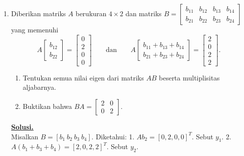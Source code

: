 \documentclass[12pt,twoside]{article}
\newenvironment{solution}
{
	\par\noindent\textbf{\underline{Solusi.}}\\
}
{
	\par
}
\begin{document}
\begin{enumerate}
\begin{solution}
          \textbf{(b) Keberadaan $z$ dengan $|p(z)| > 1$}
          Diketahui $|abc| > 1$. Ini mengimplikasikan setidaknya salah satu dari $|a|, |b|, |c| > 1$.
          Gunakan Identitas Parseval untuk polinomial pada lingkaran satuan:
          \[ \frac{1}{2\pi} \int_0^{2\pi} |p(e^{i\theta})|^2 d\theta = |a|^2 + |b|^2 + |c|^2 \]
          Andaikan $|p(z)| \leq 1$ untuk semua $z$ dengan $|z| \leq 1$.
          Maka integral di ruas kiri dibatasi oleh 1.
          \[ |a|^2 + |b|^2 + |c|^2 \leq 1 \]
          Ini memaksa $|a| \leq 1$, $|b| \leq 1$, dan $|c| \leq 1$.
          Akibatnya, $|abc| \leq 1$. Kontradiksi dengan hipotesis $|abc| > 1$.
          Oleh karena itu, pengandaian salah. Haruslah terdapat $z$ dengan $|z| \leq 1$ sehingga $|p(z)| > 1$.
        \end{solution}
  \item Diberikan matriks $A$ berukuran $4\times 2$ dan matriks $B=\begin{bmatrix}
            b_{11} & b_{12} & b_{13} & b_{14} \\
            b_{21} & b_{22} & b_{23} & b_{24}
          \end{bmatrix} $ yang memenuhi
        $$ A\begin{bmatrix}
            b_{12} \\ b_{22}
          \end{bmatrix} = \begin{bmatrix}
            0 \\ 2\\0\\0
          \end{bmatrix}	 \qquad \text{dan} \qquad A\begin{bmatrix}
            b_{11}+b_{13}+b_{14} \\
            b_{21}+b_{23}+b_{24}
          \end{bmatrix} =\begin{bmatrix}
            2 \\0\\2\\2
          \end{bmatrix}. $$
        \begin{enumerate}
          \item Tentukan semua nilai eigen dari matriks $AB$ beserta multiplisitas aljabarnya.
          \item Buktikan bahwa $BA=\begin{bmatrix}
                    2 & 0 \\
                    0 & 2
                  \end{bmatrix}$.
        \end{enumerate}
        \begin{solution}
          Misalkan $B = [b_1 \ b_2 \ b_3 \ b_4]$.
          Diketahui:
          1. $A b_2 = [0, 2, 0, 0]^T$. Sebut $y_1$.
          2. $A(b_1 + b_3 + b_4) = [2, 0, 2, 2]^T$. Sebut $y_2$.


\end{solution}
\end{enumerate}
\end{document}
